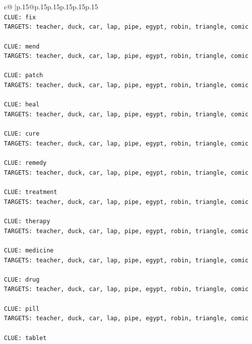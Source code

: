 \documentclass{article}
\begin{document}
{\begin{supertabular}{c@{$\;$}|p{.15\linewidth}@{}p{.15\linewidth}p{.15\linewidth}p{.15\linewidth}p{.15\linewidth}p{.15\linewidth}}
{{{\\ 
\texttt{CLUE: fix} \\
\texttt{TARGETS: teacher, duck, car, lap, pipe, egypt, robin, triangle, comic} \\
\\ 
\texttt{CLUE: mend} \\
\texttt{TARGETS: teacher, duck, car, lap, pipe, egypt, robin, triangle, comic} \\
\\ 
\texttt{CLUE: patch} \\
\texttt{TARGETS: teacher, duck, car, lap, pipe, egypt, robin, triangle, comic} \\
\\ 
\texttt{CLUE: heal} \\
\texttt{TARGETS: teacher, duck, car, lap, pipe, egypt, robin, triangle, comic} \\
\\ 
\texttt{CLUE: cure} \\
\texttt{TARGETS: teacher, duck, car, lap, pipe, egypt, robin, triangle, comic} \\
\\ 
\texttt{CLUE: remedy} \\
\texttt{TARGETS: teacher, duck, car, lap, pipe, egypt, robin, triangle, comic} \\
\\ 
\texttt{CLUE: treatment} \\
\texttt{TARGETS: teacher, duck, car, lap, pipe, egypt, robin, triangle, comic} \\
\\ 
\texttt{CLUE: therapy} \\
\texttt{TARGETS: teacher, duck, car, lap, pipe, egypt, robin, triangle, comic} \\
\\ 
\texttt{CLUE: medicine} \\
\texttt{TARGETS: teacher, duck, car, lap, pipe, egypt, robin, triangle, comic} \\
\\ 
\texttt{CLUE: drug} \\
\texttt{TARGETS: teacher, duck, car, lap, pipe, egypt, robin, triangle, comic} \\
\\ 
\texttt{CLUE: pill} \\
\texttt{TARGETS: teacher, duck, car, lap, pipe, egypt, robin, triangle, comic} \\
\\ 
\texttt{CLUE: tablet} \\
}}}
\end{supertabular}}
\end{document}
